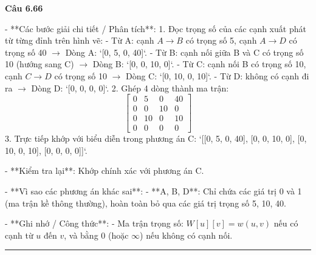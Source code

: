 \documentclass[11pt,a4paper]{article}
\newenvironment{question}[1]{%
  \par\vspace{1em}\noindent\textbf{\large Câu #1}\par\vspace{0.4em}
}{%
  \par\vspace{1em}\hrule\vspace{0.6em}
}
\begin{document}
\begin{question}{6.66}
- **Các bước giải chi tiết / Phân tích**:
  1. Đọc trọng số của các cạnh xuất phát từ từng đỉnh trên hình vẽ:
     - Từ A: cạnh \(A \rightarrow B\) có trọng số 5, cạnh \(A \rightarrow D\) có trọng số 40 \(\rightarrow\) Dòng A: `[0, 5, 0, 40]`.
     - Từ B: cạnh nối giữa B và C có trọng số 10 (hướng sang C) \(\rightarrow\) Dòng B: `[0, 0, 10, 0]`.
     - Từ C: cạnh nối B có trọng số 10, cạnh \(C \rightarrow D\) có trọng số 10 \(\rightarrow\) Dòng C: `[0, 10, 0, 10]`.
     - Từ D: không có cạnh đi ra \(\rightarrow\) Dòng D: `[0, 0, 0, 0]`.
  2. Ghép 4 dòng thành ma trận:
     \[ \begin{bmatrix} 0 & 5 & 0 & 40 \\ 0 & 0 & 10 & 0 \\ 0 & 10 & 0 & 10 \\ 0 & 0 & 0 & 0 \end{bmatrix} \]
  3. Trực tiếp khớp với biểu diễn trong phương án C: `[[0, 5, 0, 40], [0, 0, 10, 0], [0, 10, 0, 10], [0, 0, 0, 0]]`.

- **Kiểm tra lại**:
  Khớp chính xác với phương án C.

- **Vì sao các phương án khác sai**:
  - **A, B, D**: Chỉ chứa các giá trị 0 và 1 (ma trận kề thông thường), hoàn toàn bỏ qua các giá trị trọng số 5, 10, 40.

- **Ghi nhớ / Công thức**:
  - Ma trận trọng số: \(W[u][v] = w(u, v)\) nếu có cạnh từ \(u\) đến \(v\), và bằng 0 (hoặc \(\infty\)) nếu không có cạnh nối.
\end{question}
\end{document}
